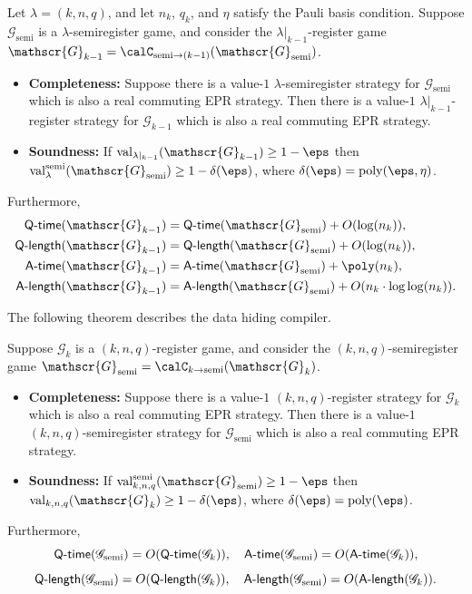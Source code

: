 \documentclass[11pt]{article}
\newcommand{\shorten}[2]{#1|_{#2}}
\newcommand{\register}{\lambda}
\newcommand{\game}{\mathscr{G}}
\newcommand{\valreg}[2]{\mathrm{val}_{#1}(#2)}
\newcommand{\valsemi}[2]{\mathrm{val}_{#1}^{\mathrm{semi}}(#2)}
\newcommand{\qtime}[1]{\mathsf{Q}\textnormal{-}\mathsf{time}(#1)}
\newcommand{\atime}[1]{\mathsf{A}\textnormal{-}\mathsf{time}(#1)}
\newcommand{\qlength}[1]{\mathsf{Q}\textnormal{-}\mathsf{length}(#1)}
\newcommand{\alength}[1]{\mathsf{A}\textnormal{-}\mathsf{length}(#1)}
\begin{document}
\begin{theorem}\label{theorem:semi-to-k-1-layer}
Let $\register = (k, n, q)$, and let $n_k$, $q_k$, and $\eta$ satisfy the Pauli basis condition.
Suppose $\game_{\mathrm{semi}}$ is a $\register$-semiregister game,
and consider the $\shorten{\register}{k-1}$-register game $\game_{k-1} = \calC_{\mathrm{semi} \rightarrow (k-1)}(\game_{\mathrm{semi}})$.
\begin{itemize}
\item[$\circ$] \textbf{Completeness:} Suppose there is a value-$1$ $\register$-semiregister strategy for $\game_{\mathrm{semi}}$ which is also a real commuting EPR strategy.
	Then there is a value-$1$ $\shorten{\register}{k-1}$-register strategy for $\game_{k-1}$ which is also a real commuting EPR strategy.
\item[$\circ$] \textbf{Soundness:} If $\valreg{\shorten{\register}{k-1}}{\game_{k-1}}\geq 1-\eps$ then $\valsemi{\register}{\game_{\mathrm{semi}}} \geq 1 -\delta(\eps)$, where $\delta(\eps) = \mathrm{poly}(\eps, \eta)$.
\end{itemize}
Furthermore,
\begin{align*}
\qtime{\game_{k-1}} &= \qtime{\game_{\mathrm{semi}}} + O(\log(n_k)), \\
\qlength{\game_{k-1}} &= \qlength{\game_{\mathrm{semi}}} + O(\log(n_k)),  \\
\atime{\game_{k-1}} &= \atime{\game_{\mathrm{semi}}} + \poly(n_k),\\
\alength{\game_{k-1}} &= \alength{\game_{\mathrm{semi}}} + O(n_k \cdot \log \log(n_k)).
\end{align*}
\end{theorem}

The following theorem describes the data hiding compiler.

\begin{theorem}\label{theorem:k-to-semi-layer}
Suppose $\game_k$ is a $(k, n, q)$-register game,
and consider the $(k, n, q)$-semiregister game $\game_{\mathrm{semi}} = \calC_{k \rightarrow \mathrm{semi}}(\game_k)$.
\begin{itemize}
\item[$\circ$] \textbf{Completeness:} 
	Suppose there is a value-$1$ $(k,n,q)$-register strategy for $\game_{k}$ which is also a real commuting EPR strategy.
	Then there is a value-$1$ $(k,n,q)$-semiregister strategy for $\game_{\mathrm{semi}}$ which is also a real commuting EPR strategy.
\item[$\circ$] \textbf{Soundness:} If $\valsemi{k,n,q}{\game_{\mathrm{semi}}} \geq 1-\eps$ then $\valreg{k,n,q}{\game_{k}} \geq 1 -\delta(\eps)$, where $\delta(\eps) = \mathrm{poly}(\eps)$.
\end{itemize}
Furthermore,
\begin{equation*}
\qtime{\game_{\mathrm{semi}}} = O(\qtime{\game_k}), \quad
\atime{\game_{\mathrm{semi}}} = O(\atime{\game_k}),
\end{equation*}
\begin{equation*}
\qlength{\game_{\mathrm{semi}}} = O(\qlength{\game_k}), \quad
\alength{\game_{\mathrm{semi}}} = O(\alength{\game_k}).
\end{equation*}
\end{theorem}
\end{document}
